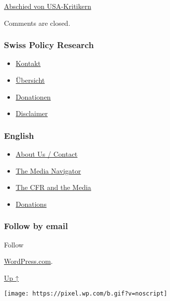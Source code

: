 \href{https://swprs.org/2017/03/01/abschied-von-usa-kritikern/}{Abschied
von USA-Kritikern}

Comments are closed.

\hypertarget{swiss-policy-research}{%
\subsubsection{Swiss Policy Research}\label{swiss-policy-research}}

\begin{itemize}
\tightlist
\item
  \href{https://swprs.org/kontakt/}{Kontakt}
\item
  \href{https://swprs.org/uebersicht/}{Übersicht}
\item
  \href{https://swprs.org/donationen/}{Donationen}
\item
  \href{https://swprs.org/disclaimer/}{Disclaimer}
\end{itemize}

\hypertarget{english}{%
\subsubsection{English}\label{english}}

\begin{itemize}
\tightlist
\item
  \href{https://swprs.org/contact/}{About Us / Contact}
\item
  \href{https://swprs.org/media-navigator/}{The Media Navigator}
\item
  \href{https://swprs.org/the-american-empire-and-its-media/}{The CFR
  and the Media}
\item
  \href{https://swprs.org/donations/}{Donations}
\end{itemize}

\hypertarget{follow-by-email}{%
\subsubsection{Follow by email}\label{follow-by-email}}

Follow

\href{https://wordpress.com/?ref=footer_custom_com}{WordPress.com}.

\protect\hyperlink{}{Up ↑}

\texttt{[image: https://pixel.wp.com/b.gif?v=noscript]}
